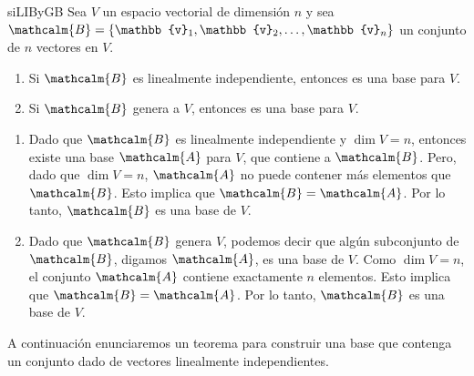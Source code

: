 \begin{theorem}{}{siLIByGB}
    Sea $V$ un espacio vectorial de dimensión $n$ y sea $\mathcalm{B} = \{\mathbb{v}_1, \mathbb{v}_2, \dots, \mathbb{v}_n\}$ un conjunto de $n$ vectores en $V$.
    \begin{enumerate}[label=\roman*), topsep=6pt, itemsep=0pt]
        \item Si $\mathcalm{B}$ es linealmente independiente, entonces es una base para $V$.
        \item Si $\mathcalm{B}$ genera a $V$, entonces es una base para $V$.
    \end{enumerate}

    \tcblower
    \demostracion
    \begin{enumerate}[label=\roman*), topsep=6pt, itemsep=0pt]
        \item Dado que $\mathcalm{B}$ es linealmente independiente y $\dim V = n$, entonces existe una base $\mathcalm{A}$ para $V$, que contiene a $\mathcalm{B}$. Pero, dado que $\dim V = n$, $\mathcalm{A}$ no puede contener más elementos que $\mathcalm{B}$. Esto implica que $\mathcalm{B} = \mathcalm{A}$. Por lo tanto, $\mathcalm{B}$ es una base de $V$.
        \item Dado que $\mathcalm{B}$ genera $V$, podemos decir que algún subconjunto de $\mathcalm{B}$, digamos $\mathcalm{A}$, es una base de $V$. Como $\dim V = n$, el conjunto $\mathcalm{A}$ contiene exactamente $n$ elementos. Esto implica que $\mathcalm{B} = \mathcalm{A}$. Por lo tanto, $\mathcalm{B}$ es una base de $V$.
    \end{enumerate}
\end{theorem}

A continuación enunciaremos un teorema para construir una base que contenga un conjunto dado de vectores linealmente independientes.

